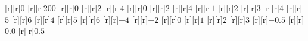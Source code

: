 \begin{psfrags}
[r][r]{$0$}%
[r][r]{$200$}%
[r][r]{$0$}%
[r][r]{$2$}%
[r][r]{$4$}%
[r][r]{$0$}%
[r][r]{$2$}%
[r][r]{$4$}%
[r][r]{$1$}%
[r][r]{$2\!$}%
[r][r]{$3$}%
[r][r]{$4$}%
[r][r]{$5$}%
[r][r]{$6$}%
[r][r]{$4$}%
[r][r]{$5$}%
[r][r]{$6$}%
[r][r]{$-4$}%
[r][r]{$-2$}%
[r][r]{$0\!$}%
[r][r]{$1$}%
[r][r]{$2$}%
[r][r]{$3$}%
[r][r]{$-0.5$}%
[r][r]{$0.0$}%
[r][r]{$0.5$}%
%
%
\end{psfrags}%
%
